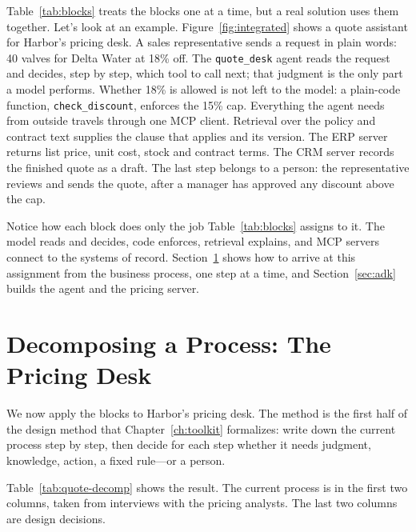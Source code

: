 Table~\ref{tab:blocks} treats the blocks one at a time, but a real solution uses them together. Let's look at an example. Figure~\ref{fig:integrated} shows a quote assistant for Harbor's pricing desk. A sales representative sends a request in plain words: 40 valves for Delta Water at 18\% off. The \texttt{quote\_desk} agent reads the request and decides, step by step, which tool to call next; that judgment is the only part a model performs. Whether 18\% is allowed is not left to the model: a plain-code function, \texttt{check\_discount}, enforces the 15\% cap. Everything the agent needs from outside travels through one MCP client. Retrieval over the policy and contract text supplies the clause that applies and its version. The ERP server returns list price, unit cost, stock and contract terms. The CRM server records the finished quote as a draft. The last step belongs to a person: the representative reviews and sends the quote, after a manager has approved any discount above the cap.

Notice how each block does only the job Table~\ref{tab:blocks} assigns to it. The model reads and decides, code enforces, retrieval explains, and MCP servers connect to the systems of record. Section~\ref{sec:decompose} shows how to arrive at this assignment from the business process, one step at a time, and Section~\ref{sec:adk} builds the agent and the pricing server.



\section{Decomposing a Process: The Pricing Desk}
\label{sec:decompose}

We now apply the blocks to Harbor's pricing desk. The method is the first half of the design method that Chapter~\ref{ch:toolkit} formalizes: write down the current process step by step, then decide for each step whether it needs judgment, knowledge, action, a fixed rule---or a person.

Table~\ref{tab:quote-decomp} shows the result. The current process is in the first two columns, taken from interviews with the pricing analysts. The last two columns are design decisions.

